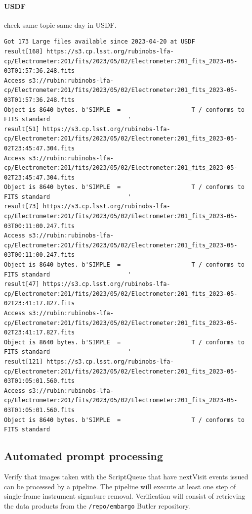 \paragraph{USDF} check same topic same day in USDF.
\begin{lstlisting}
Got 173 Large files available since 2023-04-20 at USDF
result[168] https://s3.cp.lsst.org/rubinobs-lfa-cp/Electrometer:201/fits/2023/05/02/Electrometer:201_fits_2023-05-03T01:57:36.248.fits
Access s3://rubin:rubinobs-lfa-cp/Electrometer:201/fits/2023/05/02/Electrometer:201_fits_2023-05-03T01:57:36.248.fits
Object is 8640 bytes. b'SIMPLE  =                    T / conforms to FITS standard                      '
result[51] https://s3.cp.lsst.org/rubinobs-lfa-cp/Electrometer:201/fits/2023/05/02/Electrometer:201_fits_2023-05-02T23:45:47.304.fits
Access s3://rubin:rubinobs-lfa-cp/Electrometer:201/fits/2023/05/02/Electrometer:201_fits_2023-05-02T23:45:47.304.fits
Object is 8640 bytes. b'SIMPLE  =                    T / conforms to FITS standard                      '
result[73] https://s3.cp.lsst.org/rubinobs-lfa-cp/Electrometer:201/fits/2023/05/02/Electrometer:201_fits_2023-05-03T00:11:00.247.fits
Access s3://rubin:rubinobs-lfa-cp/Electrometer:201/fits/2023/05/02/Electrometer:201_fits_2023-05-03T00:11:00.247.fits
Object is 8640 bytes. b'SIMPLE  =                    T / conforms to FITS standard                      '
result[47] https://s3.cp.lsst.org/rubinobs-lfa-cp/Electrometer:201/fits/2023/05/02/Electrometer:201_fits_2023-05-02T23:41:17.827.fits
Access s3://rubin:rubinobs-lfa-cp/Electrometer:201/fits/2023/05/02/Electrometer:201_fits_2023-05-02T23:41:17.827.fits
Object is 8640 bytes. b'SIMPLE  =                    T / conforms to FITS standard                      '
result[121] https://s3.cp.lsst.org/rubinobs-lfa-cp/Electrometer:201/fits/2023/05/02/Electrometer:201_fits_2023-05-03T01:05:01.560.fits
Access s3://rubin:rubinobs-lfa-cp/Electrometer:201/fits/2023/05/02/Electrometer:201_fits_2023-05-03T01:05:01.560.fits
Object is 8640 bytes. b'SIMPLE  =                    T / conforms to FITS standard
\end{lstlisting}

\subsection{Automated prompt processing}
Verify that images taken with the ScriptQueue that have nextVisit events issued can be processed by a pipeline.
The pipeline will execute at least one step of single-frame instrument signature removal.
Verification will consist of retrieving the data products from the \texttt{/repo/embargo} Butler repository.

